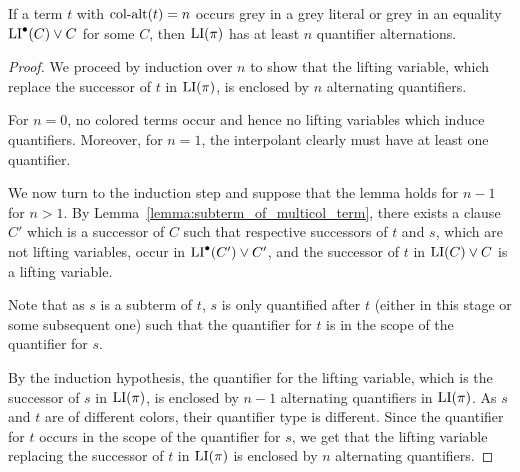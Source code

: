 \documentclass[%
	draft=false,%
	numbers=noendperiod,%
	11pt,%
	a4paper,%
	oneside,%
	openany,%
]{memoir}
\begin{document}
\begin{clemma}
	If a term $t$ with $\operatorname{col-alt}(t)=n$ occurs grey in a grey literal or grey in an equality $\operatorname{LI}^\bullet(C) \lor C$ for some $C$, then $\operatorname{LI}(\pi)$ has at least $n$ quantifier alternations.
\end{clemma}
\begin{proof}
	We proceed by induction over $n$ to show that the lifting variable, which replace the successor of $t$ in $\operatorname{LI}(\pi)$, is enclosed by $n$ alternating quantifiers.

	For $n=0$, no colored terms occur and hence no lifting variables which induce quantifiers.
	Moreover, for $n=1$, the interpolant clearly must have at least one quantifier.

	We now turn to the induction step and suppose that the lemma holds for $n-1$ for $n>1$.
	By Lemma~\ref{lemma:subterm_of_multicol_term},
	there exists a clause $C'$ which is a successor of $C$ such that respective successors of $t$ and $s$, which are not lifting variables, occur in $\operatorname{LI}^\bullet(C') \lor C'$, and the successor of $t$ in $\operatorname{LI}(C) \lor C$ is a lifting variable.

	Note that as $s$ is a subterm of $t$, $s$ is only quantified after $t$ (either in this stage or some subsequent one) such that the quantifier for $t$ is in the scope of the quantifier for $s$. 

	By the induction hypothesis, the quantifier for the lifting variable, which is the successor of $s$ in $\operatorname{LI}(\pi)$, is enclosed by $n-1$ alternating quantifiers in $\operatorname{LI}(\pi)$. 
	As $s$ and $t$ are of different colors, their quantifier type is different.
	Since the quantifier for $t$ occurs in the scope of the quantifier for $s$, we get that the lifting variable replacing the successor of $t$ in $\operatorname{LI}(\pi)$ is enclosed by $n$ alternating quantifiers.
\end{proof}
\cbend


\end{document}
